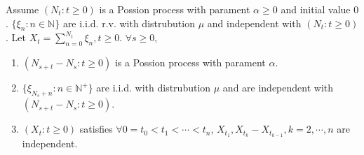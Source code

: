 \documentclass{ctexart}
\newif\ifpreface
\begin{document}
\large
\setlength{\baselineskip}{1.2em}
\ifpreface
  
\else
\fi
{}
\begin{problem}\label{pro:1}
  Assume \((N_t:t \geq 0)\) is a Possion process with parament \(\alpha \geq 0\) and initial value \(0\).
  \(\{\xi_n:n \in \mathbb{N}\}\) are i.i.d. r.v. with distrubution \(\mu\) and independent with \((N_t:t \geq 0)\).
  Let \(X_t = \sum_{n=0}^{N_t} \xi_n,t \geq 0\).
  \(\forall s \geq 0\),
  \begin{enumerate}
    \item \((N_{s + t} - N_s:t \geq 0)\) is a Possion process with parament \(\alpha\).
    \item \(\{\xi_{N_s + n}: n \in \mathbb{N}^+\}\) are i.i.d. with distrubution \(\mu\) and are
      independent with \((N_{s + t}-N_s:t \geq 0)\).
    \item \((X_t:t \geq 0)\) satisfies \(\forall 0 = t_0<t_1<\cdots<t_n\), \(X_{t_1},X_{t_k}-X_{t_{k-1}},k=2,\cdots,n\)
      are independent.
  \end{enumerate}
\end{problem}
\end{document}
